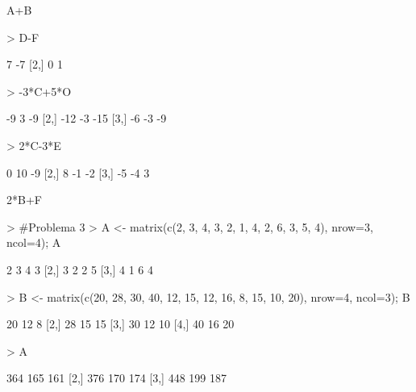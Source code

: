 \documentclass{article}
\begin{document}
A+B


\begin{Schunk}
\begin{Sinput}
> D-F
\end{Sinput}
\begin{Soutput}
     [,1] [,2]
[1,]    7   -7
[2,]    0    1
\end{Soutput}
\end{Schunk}

\begin{Schunk}
\begin{Sinput}
> -3*C+5*O
\end{Sinput}
\begin{Soutput}
     [,1] [,2] [,3]
[1,]   -9    3   -9
[2,]  -12   -3  -15
[3,]   -6   -3   -9
\end{Soutput}
\end{Schunk}

\begin{Schunk}
\begin{Sinput}
> 2*C-3*E
\end{Sinput}
\begin{Soutput}
     [,1] [,2] [,3]
[1,]    0   10   -9
[2,]    8   -1   -2
[3,]   -5   -4    3
\end{Soutput}
\end{Schunk}

2*B+F


\begin{Schunk}
\begin{Sinput}
> #Problema 3
> A <- matrix(c(2, 3, 4, 3, 2, 1, 4, 2, 6, 3, 5, 4), nrow=3, ncol=4); A
\end{Sinput}
\begin{Soutput}
     [,1] [,2] [,3] [,4]
[1,]    2    3    4    3
[2,]    3    2    2    5
[3,]    4    1    6    4
\end{Soutput}
\begin{Sinput}
> B <- matrix(c(20, 28, 30, 40, 12, 15, 12, 16, 8, 15, 10, 20), nrow=4, ncol=3); B
\end{Sinput}
\begin{Soutput}
     [,1] [,2] [,3]
[1,]   20   12    8
[2,]   28   15   15
[3,]   30   12   10
[4,]   40   16   20
\end{Soutput}
\begin{Sinput}
> A%*% B
\end{Sinput}
\begin{Soutput}
     [,1] [,2] [,3]
[1,]  364  165  161
[2,]  376  170  174
[3,]  448  199  187
\end{Soutput}
\end{Schunk}
\end{document}
